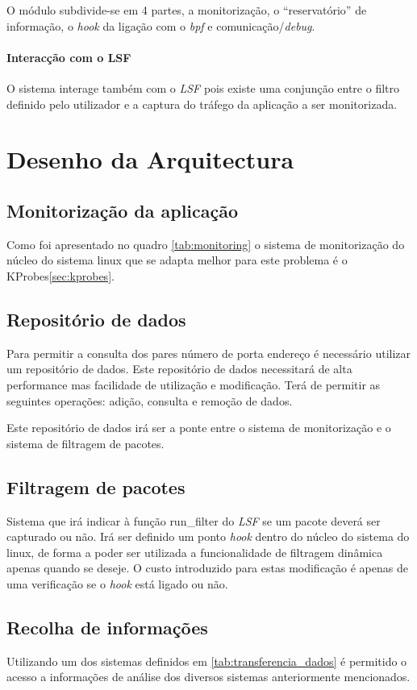 O módulo subdivide-se em 4 partes, a monitorização, o ``reservatório'' de
informação, o \textit{hook} da ligação com o \textit{bpf} e
comunicação/\textit{debug}.

\paragraph{Interacção com o LSF}
O sistema interage também com o \textit{LSF} pois existe uma conjunção
entre o filtro definido pelo utilizador e a captura do tráfego da aplicação a
ser monitorizada.

\section{Desenho da Arquitectura}



\subsection{Monitorização da aplicação}

Como foi apresentado no quadro \ref{tab:monitoring} o sistema de monitorização
do núcleo do sistema linux que se adapta melhor para este problema é o
KProbes\ref{sec:kprobes}. 

\subsection{Repositório de dados}

Para permitir a consulta dos pares número de porta endereço é necessário
utilizar um repositório de dados. Este repositório de dados necessitará de alta
performance mas facilidade de utilização e modificação. Terá de permitir as
seguintes operações: adição, consulta e remoção de dados.

Este repositório de dados irá ser a ponte entre o sistema de  monitorização e o
sistema de filtragem de pacotes. 

\subsection{Filtragem de pacotes}

Sistema que irá indicar à função run\_filter do \textit{LSF} se um pacote deverá
ser capturado ou não. Irá ser definido um ponto \textit{hook} dentro do núcleo
do sistema do linux, de forma a poder ser utilizada a funcionalidade de
filtragem dinâmica apenas quando se deseje. O custo introduzido para estas
modificação é apenas de uma verificação se o \textit{hook} está ligado ou não.


\subsection{Recolha de informações}

Utilizando um dos sistemas definidos em \ref{tab:transferencia_dados} é
permitido o acesso a informações de análise dos diversos sistemas anteriormente
mencionados.
